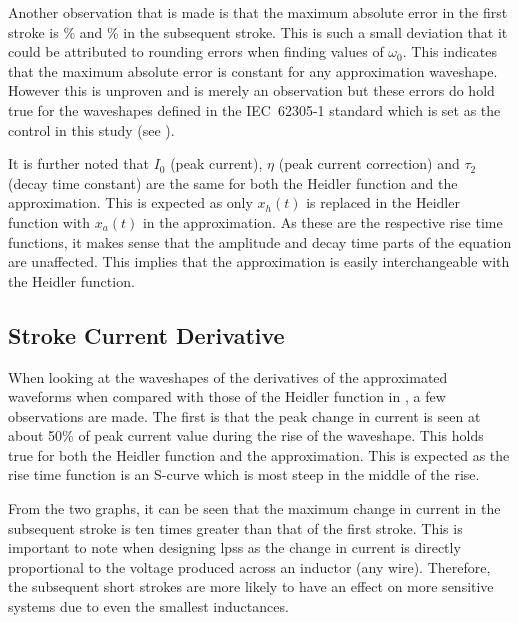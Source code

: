 Another observation that is made is that the maximum absolute error in the first stroke is \unskip \% and \unskip \% in the subsequent stroke. This is such a small deviation that it could be attributed to rounding errors when finding values of $\omega_0$. This indicates that the maximum absolute error is constant for any approximation waveshape. However this is unproven and is merely an observation but these errors do hold true for the waveshapes defined in the IEC~62305-1 standard which is set as the control in this study (see ).

It is further noted that $I_0$ (peak current), $\eta$ (peak current correction) and $\tau_2$ (decay time constant) are the same for both the Heidler function and the approximation. This is expected as only $x_h \left( t \right)$ is replaced in the Heidler function with $x_a \left( t \right)$ in the approximation. As these are the respective rise time functions, it makes sense that the amplitude and decay time parts of the equation are unaffected. This implies that the approximation is easily interchangeable with the Heidler function.

\subsection{Stroke Current Derivative}
\label{sub:discussion_stroke_current_derivative}
When looking at the waveshapes of the derivatives of the approximated waveforms when compared with those of the Heidler function in , a few observations are made. The first is that the peak change in current is seen at about 50\% of peak current value during the rise of the waveshape. This holds true for both the Heidler function and the approximation. This is expected as the rise time function is an S-curve which is most steep in the middle of the rise.

From the two graphs, it can be seen that the maximum change in current in the subsequent stroke is ten times greater than that of the first stroke. This is important to note when designing \glspl{lps} as the change in current is directly proportional to the voltage produced across an inductor (any wire). Therefore, the subsequent short strokes are more likely to have an effect on more sensitive systems due to even the smallest inductances.

